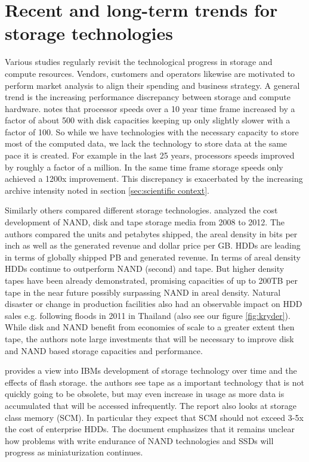 \section{Recent and long-term trends for storage technologies}
\label{sec:related work/trends storage}

Various studies regularly revisit the technological progress in storage and
compute resources. Vendors, customers and operators likewise are motivated to
perform market analysis to align their spending and business strategy. A general
trend is the increasing performance discrepancy between storage and compute
hardware. \cite{julian_m._kunkel_exascale_2014} notes that processor speeds over
a 10 year time frame increased by a factor of about 500 with disk capacities
keeping up only slightly slower with a factor of 100. So while we have
technologies with the necessary capacity to store most of the computed data, we
lack the technology to store data at the same pace it is created. For example in
the last 25 years, processors speeds improved by roughly a factor of a million.
In the same time frame storage speeds only achieved a 1200x improvement. This discrepancy is exacerbated by the increasing archive intensity noted in section
\ref{sec:scientific context}.

Similarly others compared different storage technologies.
\cite{fontana_impact_2013, decad_impact_2013} analyzed the cost development of
NAND, disk and tape storage media from 2008 to 2012. The authors compared the
units and petabytes shipped, the areal density in bits per inch as well as the
generated revenue and dollar price per GB. HDDs are leading in terms of globally
shipped PB and generated revenue. In terms of areal density HDDs continue to
outperform NAND (second) and tape. But higher density tapes have been already
demonstrated, promising capacities of up to 200TB per tape in the near future
possibly surpassing NAND in areal density. Natural disaster or change in
production facilities also had an observable impact on HDD sales e.g. following
floods in 2011 in Thailand (also see our figure \ref{fig:kryder}). While disk
and NAND benefit from economies of scale to a greater extent then tape, the
authors note large investments that will be necessary to improve disk and NAND
based storage capacities and performance.

\cite{evangelos_eleftheriou_trends_2010} provides a view into IBMs development
of storage technology over time and the effects of flash storage. the authors
see tape as a important technology that is not quickly going to be obsolete, but
may even increase in usage as more data is accumulated that will be accessed
infrequently. The report also looks at storage class memory (SCM). In particular
they expect that SCM should not exceed 3-5x the cost of enterprise HDDs. The
document emphasizes that it remains unclear how problems with write endurance of
NAND technologies and SSDs will progress as miniaturization continues.

